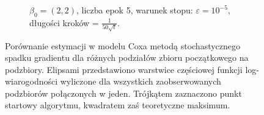 \begin{figure}[hbt!]
\begin{center}
\begin{subfigure}[h!]{0.9\textwidth}
            \caption{$\beta_0=(2,2)$, liczba epok 5, warunek stopu: $\varepsilon=10^{-5}$, długości kroków = $\frac{1}{50\sqrt{t}}$.}
   \end{subfigure}  
      \end{center}
  \caption[Porównanie estymacji w modelu Coxa metodą stochastycznego spadku gradientu dla różnych podziałów zbioru początkowego na podzbiory.]{\label{rysCox2}Porównanie estymacji w modelu Coxa metodą stochastycznego spadku gradientu dla różnych podziałów zbioru początkowego na podzbiory. Elipsami przedstawiono warstwice częściowej funkcji log-wiarogodności wyliczone dla wszystkich zaobserwowanych podzbiorów połączonych w jeden. Trójkątem zaznaczono punkt startowy algorytmu, kwadratem zaś teoretyczne maksimum.}
\end{figure}
	
	
	
